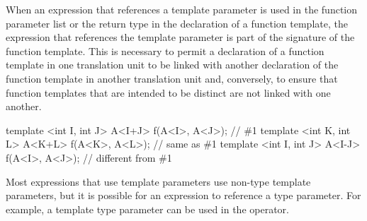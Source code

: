\pnum
When an expression that references a template parameter is used in the
function parameter list or the return type in the declaration of a
function template, the expression that references the template
parameter is part of the signature of the function template.
This is
necessary to permit a declaration of a function template in one
translation unit to be linked with another declaration of the function
template in another translation unit and, conversely, to ensure that
function templates that are intended to be distinct are not linked
with one another.
\begin{example}

\begin{codeblock}
template <int I, int J> A<I+J> f(A<I>, A<J>);   // \#1
template <int K, int L> A<K+L> f(A<K>, A<L>);   // same as \#1
template <int I, int J> A<I-J> f(A<I>, A<J>);   // different from \#1
\end{codeblock}
\end{example}
\begin{note}
Most expressions that use template parameters use non-type template
parameters, but it is possible for an expression to reference a type
parameter.
For example, a template type parameter can be used in the
 operator.
\end{note}

